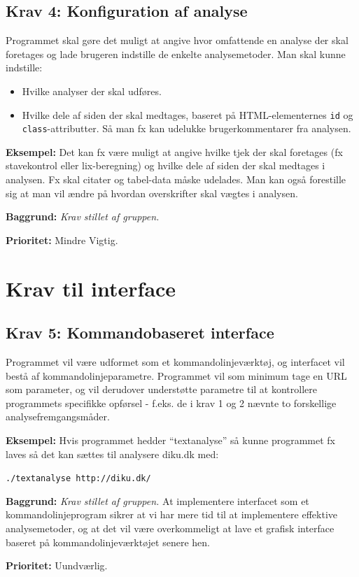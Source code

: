 \documentclass[a4paper,oneside,article, titlepage]{article}
\begin{document}

\subsection{Krav 4: Konfiguration af analyse}
Programmet skal gøre det muligt at angive hvor omfattende en analyse
der skal foretages og lade brugeren indstille de enkelte
analysemetoder. Man skal kunne indstille:

\begin{itemize}
\item Hvilke analyser der skal udføres.
\item Hvilke dele af siden der skal medtages, baseret på
  HTML-elemen\-ter\-nes \texttt{id} og \texttt{class}-attributter. Så man
  fx kan udelukke brugerkommentarer fra analysen.
\end{itemize}

\begin{description}
\item \textbf{Eksempel:} Det kan fx være muligt at angive hvilke tjek
  der skal foretages (fx stavekontrol eller lix-beregning) og hvilke
  dele af siden der skal medtages i analysen. Fx skal citater og
  tabel-data måske udelades. Man kan også forestille sig at man vil
  ændre på hvordan overskrifter skal vægtes i analysen.
\item \textbf{Baggrund:} \textit{Krav stillet af gruppen.}
\item \textbf{Prioritet:} Mindre Vigtig.
\end{description}

\section{Krav til interface}

\subsection{Krav 5: Kommandobaseret interface}
Programmet vil være udformet som et kommandolinjeværktøj, og
interfacet vil bestå af kommandolinjeparametre. Programmet vil som
minimum tage en URL som parameter, og vil derudover understøtte
parametre til at kontrollere programmets specifikke opførsel -
f.eks. de i krav 1 og 2 nævnte to forskellige
analysefremgangsmåder.
\begin{description}
\item \textbf{Eksempel:} Hvis programmet hedder ``textanalyse'' så
  kunne programmet fx laves så det kan sættes til analysere diku.dk
  med:

  \texttt{./textanalyse http://diku.dk/}

\item \textbf{Baggrund:} \textit{Krav stillet af gruppen.} At
  implementere interfacet som et kommandolinjeprogram sikrer at vi har
  mere tid til at implementere effektive analysemetoder, og at det vil
  være overkommeligt at lave et grafisk interface baseret på
  kommandolinjeværktøjet senere hen.
\item \textbf{Prioritet:} Uundværlig.
\end{description}
\end{document}
